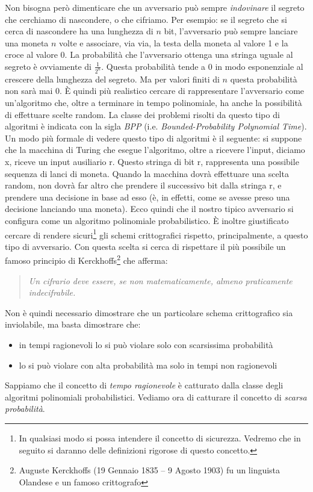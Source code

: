 \documentclass[a4paper,openright,twoside,12pt]{report}
\begin{document}
Non bisogna per\`o dimenticare che un avversario può sempre \emph{indovinare} il segreto che cerchiamo di nascondere, o che cifriamo. 
Per esempio: se il segreto che si cerca di nascondere ha una lunghezza di $n$ bit, l'avversario può sempre
lanciare una moneta $n$ volte e associare, via via, la testa della moneta al valore 1 e la croce al valore 0.
La probabilit\`a che l'avversario ottenga una stringa uguale al segreto \`e ovviamente di $\frac{1}{2^n}$. 
Questa probabilit\`a tende a 0 in modo esponenziale al crescere della lunghezza del segreto. Ma per valori finiti di $n$ questa probabilit\`a non sar\`a mai 0.
\`E quindi pi\`u realistico cercare di rappresentare l'avversario come un'algoritmo che, oltre a terminare in tempo polinomiale, ha
anche la possibilit\`a di effettuare scelte random.
La classe dei problemi risolti da questo tipo di algoritmi \`e indicata con la
sigla \emph{BPP} (i.e. \emph{Bounded-Probability Polynomial Time}).\\Un modo pi\`u formale di vedere questo tipo di algoritmi \`e il seguente: si suppone che la macchina di Turing che 
esegue l'algoritmo, oltre a ricevere l'input, diciamo x, riceve un input ausiliario r. Questo stringa di bit r, rappresenta una possibile sequenza di lanci di moneta.
Quando la macchina dovr\`a effettuare una scelta random, non dovr\`a far altro che prendere il successivo bit dalla stringa r, e prendere una decisione in base ad esso
(\`e, in effetti, come se avesse preso una decisione lanciando una moneta). Ecco quindi che il nostro tipico avversario si configura come un algoritmo polinomiale probabilistico.
\`E inoltre giustificato cercare di rendere sicuri\footnote{In qualsiasi modo si possa intendere il concetto di sicurezza. 
Vedremo che in seguito si daranno delle definizioni rigorose di questo concetto.} gli schemi crittografici rispetto, principalmente, a questo tipo di avversario.
Con questa scelta si cerca di rispettare il pi\`u possibile un famoso principio di Kerckhoffs\footnote{Auguste Kerckhoffs (19 Gennaio 1835 – 9 Agosto 1903) 
fu un linguista Olandese e un famoso crittografo} che afferma: 
\begin{quotation}
\em
Un cifrario deve essere, se non matematicamente, almeno praticamente indecifrabile.
\end{quotation}
Non \`e quindi necessario dimostrare che un particolare schema crittografico sia inviolabile, ma basta dimostrare che:
\begin{itemize}
 \item in tempi ragionevoli lo si pu\`o violare solo con scarsissima probabilit\`a
 \item lo si pu\`o violare con alta probabilit\`a ma solo in tempi non ragionevoli
\end{itemize}
Sappiamo che il concetto di \emph{tempo ragionevole} \`e catturato dalla classe degli algoritmi polinomiali probabilistici. Vediamo ora di catturare il concetto di \emph{scarsa probabilit\`a}.
\end{document}
